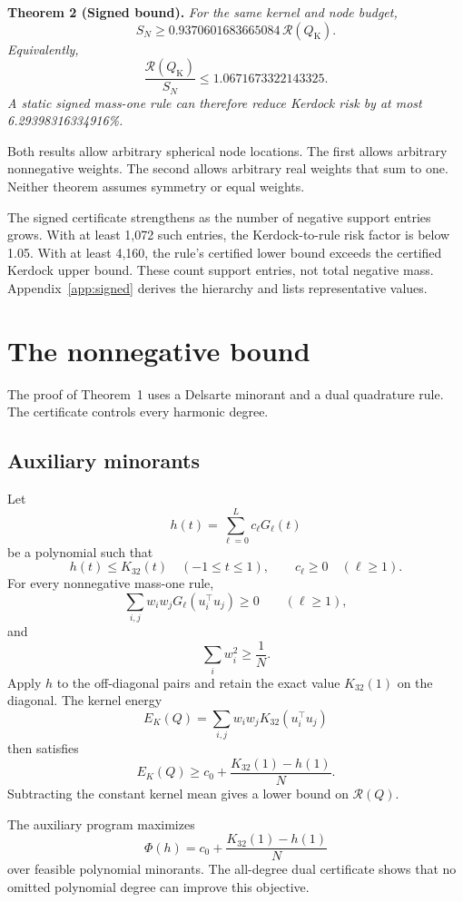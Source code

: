 \documentclass[11pt]{article}
\begin{document}
\textbf{Theorem 2 (Signed bound).}
\emph{For the same kernel and node budget,}
\[
S_N
\geq 0.9370601683665084\,\mathcal{R}(Q_{\mathrm K}).
\]
\emph{Equivalently,}
\[
\frac{\mathcal{R}(Q_{\mathrm K})}{S_N}
\leq 1.0671673322143325.
\]
\emph{A static signed mass-one rule can therefore reduce Kerdock risk by
at most 6.29398316334916\%.}

Both results allow arbitrary spherical node locations. The first allows
arbitrary nonnegative weights. The second allows arbitrary real weights
that sum to one. Neither theorem assumes symmetry or equal weights.

The signed certificate strengthens as the number of negative support
entries grows. With at least 1,072 such entries, the Kerdock-to-rule risk
factor is below 1.05. With at least 4,160, the rule's certified lower bound
exceeds the certified Kerdock upper bound. These count support entries, not
total negative mass. Appendix~\ref{app:signed} derives the hierarchy and
lists representative values.

\section{The nonnegative bound}\label{the-nonnegative-bound}

The proof of Theorem~1 uses a Delsarte minorant and a dual quadrature rule.
The certificate controls every harmonic degree.

\subsection{Auxiliary minorants}\label{auxiliary-minorants}

Let
\[
h(t)=\sum_{\ell=0}^{L}c_\ell G_\ell(t)
\]
be a polynomial such that
\[
h(t)\leq K_{32}(t) \quad (-1\leq t\leq1),
\qquad
c_\ell\geq0 \quad (\ell\geq1).
\]
For every nonnegative mass-one rule,
\[
\sum_{i,j}w_iw_jG_\ell(u_i^\top u_j)\geq0
\qquad (\ell\geq1),
\]
and
\[
\sum_i w_i^2\geq\frac1N.
\]
Apply \(h\) to the off-diagonal pairs and retain the exact value
\(K_{32}(1)\) on the diagonal. The kernel energy
\[
E_K(Q)=\sum_{i,j}w_iw_jK_{32}(u_i^\top u_j)
\]
then satisfies
\[
E_K(Q)
\geq c_0+\frac{K_{32}(1)-h(1)}{N}.
\]
Subtracting the constant kernel mean gives a lower bound on
\(\mathcal{R}(Q)\).

The auxiliary program maximizes
\[
\Phi(h)=c_0+\frac{K_{32}(1)-h(1)}{N}
\]
over feasible polynomial minorants. The all-degree dual certificate shows
that no omitted polynomial degree can improve this objective.
\end{document}
